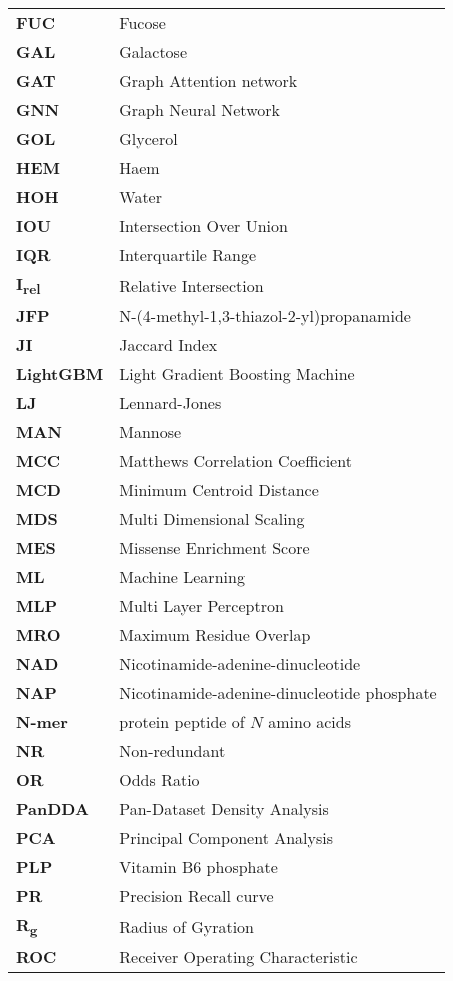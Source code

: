 \begin{longtable}[l]{@{}p{2.5cm}p{12cm}@{}}
\textbf{FUC} & Fucose \\
\textbf{GAL} & Galactose \\
\textbf{GAT} & Graph Attention network \\
\textbf{GNN} & Graph Neural Network \\
\textbf{GOL} & Glycerol \\
\textbf{HEM} & Haem \\
\textbf{HOH} & Water \\
\textbf{IOU} & Intersection Over Union \\
\textbf{IQR} & Interquartile Range \\
\textbf{I\textsubscript{rel}} & Relative Intersection \\
\textbf{JFP} & N-(4-methyl-1,3-thiazol-2-yl)propanamide \\
\textbf{JI} & Jaccard Index \\
\textbf{LightGBM} & Light Gradient Boosting Machine \\
\textbf{LJ} & Lennard-Jones \\
\textbf{MAN} & Mannose \\
\textbf{MCC} & Matthews Correlation Coefficient \\
\textbf{MCD} & Minimum Centroid Distance \\
\textbf{MDS} & Multi Dimensional Scaling \\
\textbf{MES} & Missense Enrichment Score \\
\textbf{ML} & Machine Learning \\
\textbf{MLP} & Multi Layer Perceptron \\
\textbf{MRO} & Maximum Residue Overlap \\
\textbf{NAD} & Nicotinamide-adenine-dinucleotide \\
\textbf{NAP} & Nicotinamide-adenine-dinucleotide phosphate \\
\textbf{N-mer} & protein peptide of $N$ amino acids \\
\textbf{NR} & Non-redundant \\
\textbf{OR} & Odds Ratio \\
\textbf{PanDDA} & Pan-Dataset Density Analysis \\
\textbf{PCA} & Principal Component Analysis \\
\textbf{PLP} & Vitamin B6 phosphate \\
\textbf{PR} & Precision Recall curve \\
\textbf{R\textsubscript{g}} & Radius of Gyration \\
\textbf{ROC} & Receiver Operating Characteristic \\

\end{longtable}
